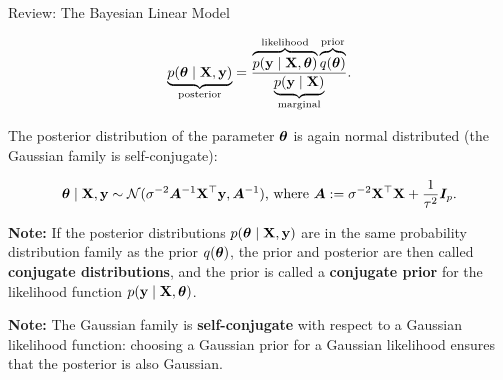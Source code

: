 \begin{frame}[c, allowframebreaks]{Review: The Bayesian Linear Model}
\begin{itemize}
\end{itemize}




$$
\underbrace{p(\bm{\theta} \mid \mathbf{X}, \mathbf{y})}_{\text{posterior}} = \frac{\overbrace{p(\mathbf{y} \mid \mathbf{X}, \bm{\theta})}^{\text{likelihood}}\overbrace{q(\bm{\theta})}^{\text{prior}}}{\underbrace{p(\mathbf{y}\mid\mathbf{X})}_{\text{marginal}}}.
$$


\framebreak

The posterior distribution of the parameter $\bm{\theta}$ is again normal distributed (the Gaussian family is self-conjugate): 

$$
\bm{\theta} \mid \mathbf{X}, \mathbf{y} \sim \mathcal{N}(\sigma^{-2}\bm{A}^{-1}\mathbf{X}^\top\mathbf{y}, \bm{A}^{-1})\text{, where }\bm{A}:= \sigma^{-2}\mathbf{X}^\top\mathbf{X} + \frac{1}{\tau^2} \boldsymbol{I}_p.
$$


\lz 

\begin{footnotesize}
\textbf{Note:} If the posterior distributions $p(\bm{\theta}\mid\mathbf{X}, \mathbf{y})$ are in the same probability distribution family as the prior $q(\bm{\theta})$, the prior and posterior are then called \textbf{conjugate distributions}, and the prior is  called a \textbf{conjugate prior} for the likelihood function $p(\mathbf{y}\mid\mathbf{X}, \bm{\theta})$. 
\end{footnotesize}

\lz

\begin{footnotesize}
\textbf{Note:} The Gaussian family is \textbf{self-conjugate} with respect to a Gaussian likelihood function: choosing a Gaussian prior for a Gaussian likelihood ensures that the posterior is also Gaussian.
\end{footnotesize}


\framebreak



\framebreak




\end{frame}
